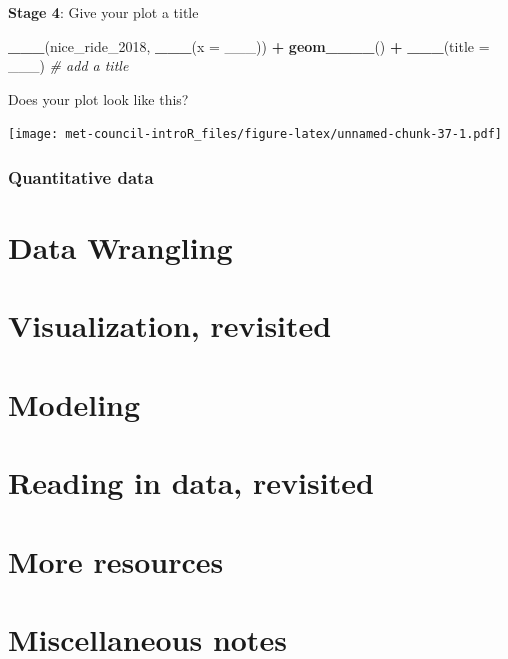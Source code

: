\documentclass[]{book}
\newenvironment{Shaded}{\begin{snugshade}}{\end{snugshade}}
\newcommand{\KeywordTok}[1]{\textcolor[rgb]{0.13,0.29,0.53}{\textbf{#1}}}
\newcommand{\DataTypeTok}[1]{\textcolor[rgb]{0.13,0.29,0.53}{#1}}
\newcommand{\DecValTok}[1]{\textcolor[rgb]{0.00,0.00,0.81}{#1}}
\newcommand{\StringTok}[1]{\textcolor[rgb]{0.31,0.60,0.02}{#1}}
\newcommand{\CommentTok}[1]{\textcolor[rgb]{0.56,0.35,0.01}{\textit{#1}}}
\newcommand{\OperatorTok}[1]{\textcolor[rgb]{0.81,0.36,0.00}{\textbf{#1}}}
\newcommand{\NormalTok}[1]{#1}
\begin{document}
\textbf{Stage 4}: Give your plot a title

\begin{Shaded}
\begin{Highlighting}[]
\KeywordTok{___}\NormalTok{(nice_ride_}\DecValTok{2018}\NormalTok{, }\KeywordTok{___}\NormalTok{(}\DataTypeTok{x =}\NormalTok{ ___)) }\OperatorTok{+}\StringTok{ }
\StringTok{  }\KeywordTok{geom____}\NormalTok{() }\OperatorTok{+}
\StringTok{  }\KeywordTok{___}\NormalTok{(}\DataTypeTok{title =}\NormalTok{ ___) }\CommentTok{# add a title}
\end{Highlighting}
\end{Shaded}

Does your plot look like this?

\texttt{[image: met-council-introR\_files/figure-latex/unnamed-chunk-37-1.pdf]}

\subsection{Quantitative data}\label{quantitative-data}

\chapter{Data Wrangling}\label{data-wrangling}

\chapter{Visualization, revisited}\label{visualization-revisited}

\chapter{Modeling}\label{modeling}

\chapter{Reading in data, revisited}\label{reading-in-data-revisited}

\chapter{More resources}\label{more-resources}

\chapter{Miscellaneous notes}\label{miscellaneous-notes}


\end{document}
